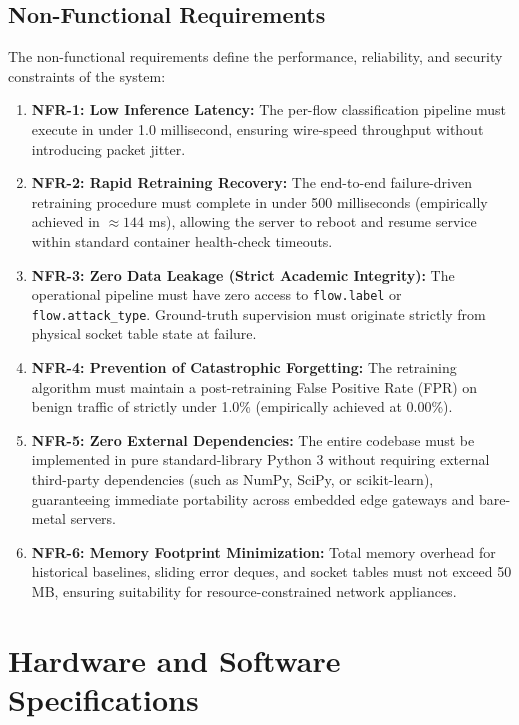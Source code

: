 \documentclass[12pt,a4paper,oneside]{report}
\begin{document}
\subsection{Non-Functional Requirements}
The non-functional requirements define the performance, reliability, and security constraints of the system:
\begin{enumerate}
    \item \textbf{NFR-1: Low Inference Latency:} The per-flow classification pipeline must execute in under 1.0 millisecond, ensuring wire-speed throughput without introducing packet jitter.
    \item \textbf{NFR-2: Rapid Retraining Recovery:} The end-to-end failure-driven retraining procedure must complete in under 500 milliseconds (empirically achieved in $\approx 144$ ms), allowing the server to reboot and resume service within standard container health-check timeouts.
    \item \textbf{NFR-3: Zero Data Leakage (Strict Academic Integrity):} The operational pipeline must have zero access to \texttt{flow.label} or \texttt{flow.attack\_type}. Ground-truth supervision must originate strictly from physical socket table state at failure.
    \item \textbf{NFR-4: Prevention of Catastrophic Forgetting:} The retraining algorithm must maintain a post-retraining False Positive Rate (FPR) on benign traffic of strictly under 1.0\% (empirically achieved at 0.00\%).
    \item \textbf{NFR-5: Zero External Dependencies:} The entire codebase must be implemented in pure standard-library Python 3 without requiring external third-party dependencies (such as NumPy, SciPy, or scikit-learn), guaranteeing immediate portability across embedded edge gateways and bare-metal servers.
    \item \textbf{NFR-6: Memory Footprint Minimization:} Total memory overhead for historical baselines, sliding error deques, and socket tables must not exceed 50 MB, ensuring suitability for resource-constrained network appliances.
\end{enumerate}

\section{Hardware and Software Specifications}
\end{document}
